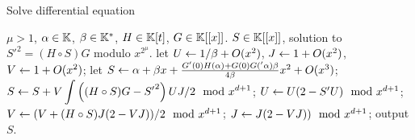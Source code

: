 \begin{algorithm}
  \caption{\label{alg:le-si-diff} Solve differential equation}
  \begin{algorithmic}[1]
    \REQUIRE $\mu>1$, $\alpha\in\mathbb{K}$, $\beta\in\mathbb{K}^\ast$, $H\in\mathbb{K}[t]$, $G\in\mathbb{K}[[x]]$.
    \ENSURE $S\in\mathbb{K}[[x]]$, solution to ${S'}^2=(H\circ S)G$ modulo $x^{2^\mu}$.
    \STATE let $U \leftarrow 1/\beta +O(x^2)$, $J \leftarrow 1 + O(x^2)$, $V \leftarrow 1 + O(x^2)$;
    \STATE let $S \leftarrow \alpha + \beta x +  \frac{G'(0)H(\alpha) + G(0)G('\alpha)\beta}{4\beta}x^2+O(x^3)$;
    \STATE \label{alg:le-si-diff:int}$S \leftarrow S + V\displaystyle\int\left((H\circ S)G - {S'}^2\right)UJ/2 \mod x^{d+1}$;
    \STATE $U \leftarrow U(2 - S' U) \mod x^{d+1}$;
    \STATE $V \leftarrow (V +  (H\circ S) J (2 - VJ))/2 \mod x^{d+1}$;
    \STATE $J \leftarrow J(2-VJ)) \mod x^{d+1}$;
    \ENDFOR
    \STATE output $S$.
  \end{algorithmic}
\end{algorithm}

